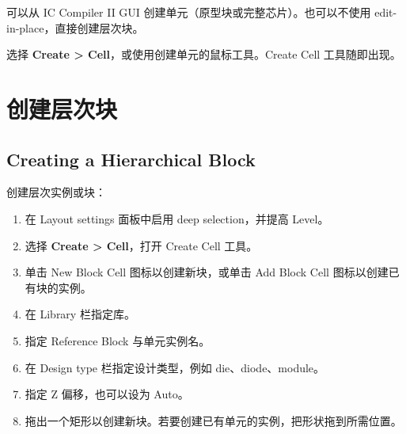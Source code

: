 \label{chap:gui-cell}

可以从 IC Compiler II GUI 创建单元（原型块或完整芯片）。也可以不使用 edit-in-place，直接创建层次块。

选择 \textbf{Create > Cell}，或使用创建单元的鼠标工具。Create Cell 工具随即出现。

\section{创建层次块}
\subsection*{Creating a Hierarchical Block}

创建层次实例或块：
\begin{enumerate}
  \item 在 Layout settings 面板中启用 deep selection，并提高 Level。
  \item 选择 \textbf{Create > Cell}，打开 Create Cell 工具。
  \item 单击 New Block Cell 图标以创建新块，或单击 Add Block Cell 图标以创建已有块的实例。
  \item 在 Library 栏指定库。
  \item 指定 Reference Block 与单元实例名。
  \item 在 Design type 栏指定设计类型，例如 die、diode、module。
  \item 指定 Z 偏移，也可以设为 Auto。
  \item 拖出一个矩形以创建新块。若要创建已有单元的实例，把形状拖到所需位置。
\end{enumerate}
